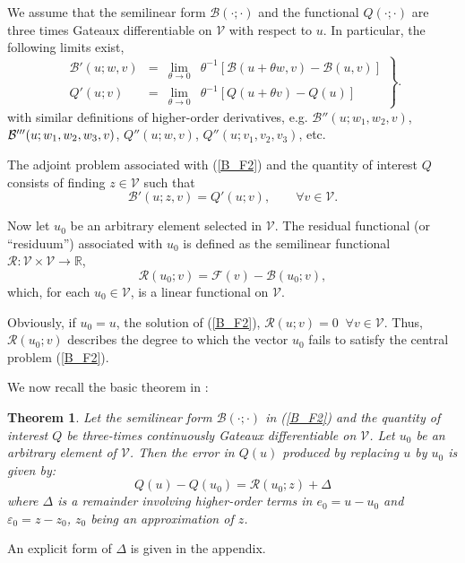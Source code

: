 \documentclass[]{article}
\newtheorem{theorem}{Theorem}
\begin{document}
We assume that the semilinear form $\mathcal{B} ( \cdot ; \cdot )$ and the functional $Q ( \cdot ; \cdot )$ are three times Gateaux differentiable on $\mathcal{V}$ with respect to $u$. In particular, the following limits exist,
%
\begin{equation}
\left.\begin{matrix}
\mathcal{B}'(u; w, v) & = & \lim_{\theta \rightarrow 0} & \theta^{-1} \left[ \mathcal{B}(u+\theta w, v) - \mathcal{B}(u, v) \right] \\ 
Q' (u;v) & = & \lim_{\theta \rightarrow 0} & \theta^{-1} \left[ Q(u+\theta v) - Q(u) \right ]
\end{matrix}\right\}.
\end{equation}
%
%
with similar definitions of higher-order derivatives, e.g. $\mathcal{B}''(u; w_1, w_2,v)$, $\mathcal{B}'''(u; w_1,\\ w_2, w_3, v)$, $Q''(u; w, v)$, $Q''(u; v_1, v_2, v_3)$, etc. 

The adjoint problem associated with (\ref{B_F2}) and the quantity of interest $Q$ consists of finding $z \in \mathcal{V}$ such that 
%
\begin{equation}\label{Bprime_Qprime2}
\mathcal{B}' (u; z, v) = Q' (u; v), \qquad \forall v \in \mathcal{V}.
\end{equation} 



Now let $u_0$ be an arbitrary element selected in $\mathcal{V}$. The residual functional (or ``residuum'') associated with $u_0$ is defined as the semilinear functional $\mathcal{R}: \mathcal{V} \times \mathcal{V} \rightarrow \mathbb{R}$,
%
\begin{equation}
\mathcal{R} (u_0; v) = \mathcal{F}(v) - \mathcal{B}(u_0;v),
\end{equation}
%
%
which, for each $u_0 \in \mathcal{V}$, is a linear functional on $\mathcal{V}$.

Obviously, if $u_0 = u$, the solution of (\ref{B_F2}), $\mathcal{R}(u;v)=0 \;\; \forall v \in \mathcal{V}$.
Thus, $\mathcal{R}(u_0;v)$ describes the degree to which the vector $u_0$ fails to satisfy the central problem (\ref{B_F2}).

We now recall the basic theorem in \cite{oden2006}:
%
\begin{theorem}\label{theorem:1} 
Let the semilinear form $\mathcal{B}(\cdot ; \cdot)$ in (\ref{B_F2}) and the quantity of interest $Q$ be three-times continuously Gateaux differentiable on $\mathcal{V}$.
Let $u_0$ be an arbitrary element of $\mathcal{V}$.
Then the error in $Q(u)$ produced by replacing $u$ by $u_0$ is given by:
%
\begin{equation}\label{Qu_Qu0}
Q(u) - Q(u_0) = \mathcal{R}(u_0;z) + \Delta
\end{equation}
%
where $\Delta$ is a remainder involving higher-order terms in $e_0 = u - u_0$ and $\varepsilon_0 = z - z_0$, $z_0$ being an approximation of $z$.
\end{theorem}An explicit form of $\Delta$ is given in the appendix.
\end{document}
